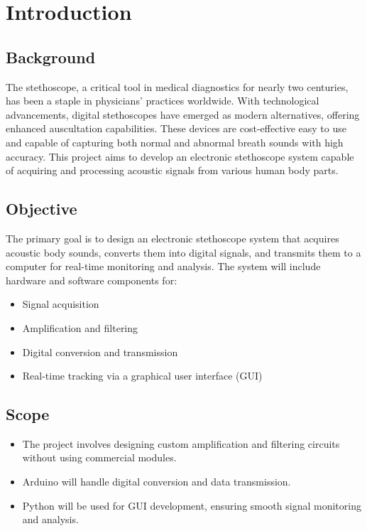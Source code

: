 \chapter{Introduction}

\section{Background}
The stethoscope, a critical tool in medical diagnostics for nearly two centuries, has been a staple in physicians’ practices worldwide. With technological advancements, digital stethoscopes have emerged as modern alternatives, offering enhanced auscultation capabilities. These devices are cost-effective easy to use and capable of capturing both normal and abnormal breath sounds with high accuracy. This project aims to develop an electronic stethoscope system capable of acquiring and processing acoustic signals from various human body parts.

\section{Objective}
The primary goal is to design an electronic stethoscope system that acquires acoustic body sounds, converts them into digital signals, and transmits them to a computer for real-time monitoring and analysis. The system will include hardware and software components for:

\begin{itemize}
    \item Signal acquisition
    \item Amplification and filtering
    \item Digital conversion and transmission
    \item Real-time tracking via a graphical user interface (GUI)
\end{itemize}

\section{Scope}

\begin{itemize}
    \item The project involves designing custom amplification and filtering circuits without using commercial modules.
    \item Arduino will handle digital conversion and data transmission.
    \item Python will be used for GUI development, ensuring smooth signal monitoring and analysis.
\end{itemize}
